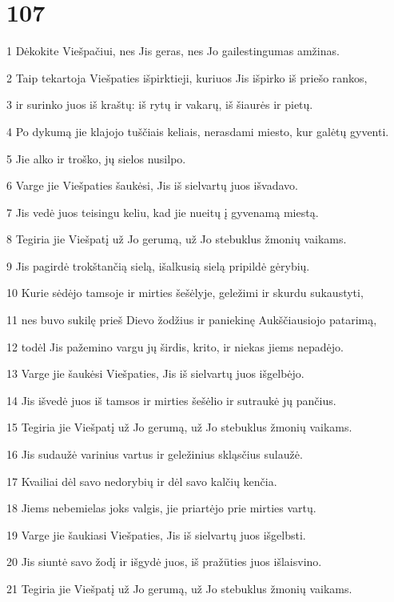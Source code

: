 \chapter{107}


\par 1 Dėkokite Viešpačiui, nes Jis geras, nes Jo gailestingumas amžinas. 
\par 2 Taip tekartoja Viešpaties išpirktieji, kuriuos Jis išpirko iš priešo rankos, 
\par 3 ir surinko juos iš kraštų: iš rytų ir vakarų, iš šiaurės ir pietų. 
\par 4 Po dykumą jie klajojo tuščiais keliais, nerasdami miesto, kur galėtų gyventi. 
\par 5 Jie alko ir troško, jų sielos nusilpo. 
\par 6 Varge jie Viešpaties šaukėsi, Jis iš sielvartų juos išvadavo. 
\par 7 Jis vedė juos teisingu keliu, kad jie nueitų į gyvenamą miestą. 
\par 8 Tegiria jie Viešpatį už Jo gerumą, už Jo stebuklus žmonių vaikams. 
\par 9 Jis pagirdė trokštančią sielą, išalkusią sielą pripildė gėrybių. 
\par 10 Kurie sėdėjo tamsoje ir mirties šešėlyje, geležimi ir skurdu sukaustyti,­ 
\par 11 nes buvo sukilę prieš Dievo žodžius ir paniekinę Aukščiausiojo patarimą, 
\par 12 todėl Jis pažemino vargu jų širdis,­ krito, ir niekas jiems nepadėjo. 
\par 13 Varge jie šaukėsi Viešpaties, Jis iš sielvartų juos išgelbėjo. 
\par 14 Jis išvedė juos iš tamsos ir mirties šešėlio ir sutraukė jų pančius. 
\par 15 Tegiria jie Viešpatį už Jo gerumą, už Jo stebuklus žmonių vaikams. 
\par 16 Jis sudaužė varinius vartus ir geležinius skląsčius sulaužė. 
\par 17 Kvailiai dėl savo nedorybių ir dėl savo kalčių kenčia. 
\par 18 Jiems nebemielas joks valgis, jie priartėjo prie mirties vartų. 
\par 19 Varge jie šaukiasi Viešpaties, Jis iš sielvartų juos išgelbsti. 
\par 20 Jis siuntė savo žodį ir išgydė juos, iš pražūties juos išlaisvino. 
\par 21 Tegiria jie Viešpatį už Jo gerumą, už Jo stebuklus žmonių vaikams. 
